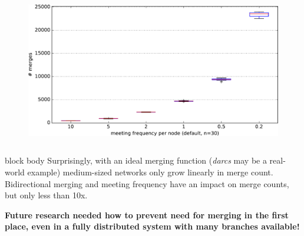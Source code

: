 \documentclass[final,hyperref={pdfpagelabels=false}]{beamer}
\begin{document}
\begin{frame}
\begin{columns}
\begin{column}{.9\textwidth}
\begin{columns}
\begin{column}{.3\textwidth}
\begin{figure}
      \includegraphics[width=\linewidth]{fig/dumb_meeting_frequency_n=30.pdf}
    \end{figure}
  \end{column}

  \end{columns}

  \vspace{10mm}
  \begin{center}
  
  \end{center}


  \vspace{1mm}
  \begin{beamercolorbox}[leftskip=0.5em,rightskip=0.5em,colsep*=.75ex,sep=0.5ex,vmode]{block body}%
  \vspace{0.2em}
  Surprisingly, with an ideal merging function (\textit{darcs} may be a real-world example) medium-sized networks only grow linearly in merge count. \\
  Bidirectional merging and meeting frequency have an impact on merge counts, but only less than 10x. \\
  \vspace{0.2em}
  \end{beamercolorbox}

  \vspace{1.5cm}
  \begin{center}
  \textbf{Future research needed how to prevent need for merging in the first place, even in a fully distributed system with many branches available!}
  \end{center}

\end{column}
\end{columns}
\end{frame}
\end{document}
